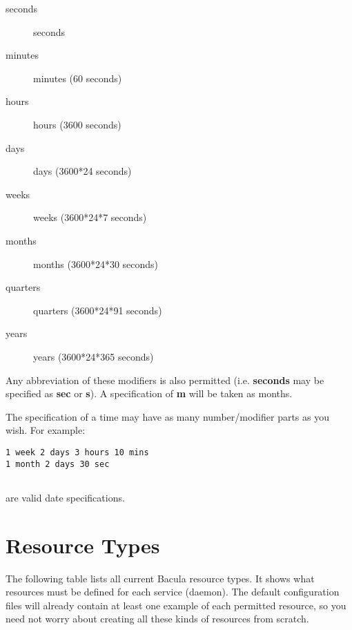 \begin{description}
\begin{description}

\item [seconds]
   seconds 

\item [minutes]
   minutes (60 seconds)  

\item [hours]
   hours (3600 seconds)  

\item [days]
   days (3600*24 seconds)  

\item [weeks]
   weeks (3600*24*7 seconds)

\item [months]
   months (3600*24*30 seconds)  

\item [quarters]
   quarters (3600*24*91 seconds)  

\item [years]
   years (3600*24*365 seconds)  
\end{description}

Any abbreviation of these modifiers is also permitted (i.e.  {\bf seconds}
may be specified as {\bf sec} or {\bf s}).  A specification of {\bf m} will
be taken as months.

The specification of a time may have as many number/modifier parts as you
wish.  For example:

\footnotesize
\begin{verbatim}
1 week 2 days 3 hours 10 mins
1 month 2 days 30 sec
   
\end{verbatim}
\normalsize

are valid date specifications.

\end{description}

\label{ResTypes}
\section{Resource Types}

The following table lists all current Bacula resource types. It shows what
resources must be defined for each service (daemon). The default configuration
files will already contain at least one example of each permitted resource, so
you need not worry about creating all these kinds of resources from scratch. 

